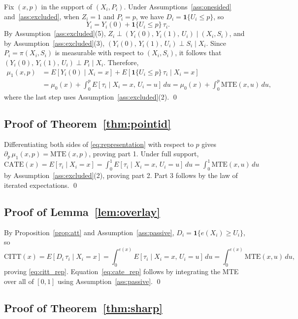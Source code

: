 \documentclass[11pt]{article}
\begin{document}
Fix $(x,p)$ in the support of $(X_i, P_i)$.  Under Assumptions~\ref{ass:onesided}
and~\ref{ass:excluded}, when $Z_i=1$ and $P_i=p$, we have $D_i =
\mathbf{1}\{U_i \leq p\}$, so
\[
  Y_i = Y_i(0) + \mathbf{1}\{U_i \leq p\}\,\tau_i.
\]
By Assumption~\ref{ass:excluded}(5), $Z_i \perp (Y_i(0),\, Y_i(1),\, U_i) \mid
(X_i, S_i)$, and by Assumption~\ref{ass:excluded}(3), $(Y_i(0),\, Y_i(1),\, U_i)
\perp S_i \mid X_i$.  Since $P_i = \pi(X_i, S_i)$ is measurable with respect
to $(X_i, S_i)$, it follows that $(Y_i(0),\, Y_i(1),\, U_i) \perp P_i \mid
X_i$.  Therefore,
\begin{align*}
  \mu_1(x,p)
  &= E[Y_i(0) \mid X_i=x] + E[\mathbf{1}\{U_i\leq p\}\,\tau_i \mid X_i=x] \\
  &= \mu_0(x) + \int_0^p E[\tau_i \mid X_i=x,\, U_i=u]\,du
   = \mu_0(x) + \int_0^p \mathrm{MTE}(x,u)\,du,
\end{align*}
where the last step uses Assumption~\ref{ass:excluded}(2). \qed

\subsection*{Proof of Theorem~\ref{thm:pointid}}

Differentiating both sides of \eqref{eq:representation} with respect to $p$
gives $\partial_p\,\mu_1(x,p) = \mathrm{MTE}(x,p)$, proving part 1.  Under full
support, $\mathrm{CATE}(x) = E[\tau_i \mid X_i=x] = \int_0^1
E[\tau_i \mid X_i=x,\, U_i=u]\,du = \int_0^1 \mathrm{MTE}(x,u)\,du$ by
Assumption~\ref{ass:excluded}(2), proving part 2.  Part 3 follows by the law of
iterated expectations. \qed

\subsection*{Proof of Lemma~\ref{lem:overlay}}

By Proposition~\ref{prop:att} and Assumption~\ref{ass:passive}, $D_i =
\mathbf{1}\{e(X_i) \geq U_i\}$, so
\[
  \mathrm{CITT}(x) = E[D_i\,\tau_i \mid X_i=x]
  = \int_0^{e(x)} E[\tau_i \mid X_i=x,\, U_i=u]\,du
  = \int_0^{e(x)} \mathrm{MTE}(x,u)\,du,
\]
proving \eqref{eq:citt_rep}.  Equation~\eqref{eq:cate_rep} follows by
integrating the MTE over all of $[0,1]$ using Assumption~\ref{ass:passive}. \qed

\subsection*{Proof of Theorem~\ref{thm:sharp}}
\end{document}
